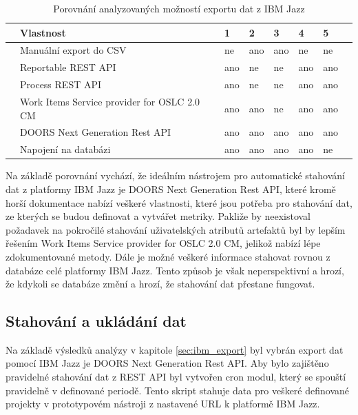 \documentclass[czech,master,public,dept460,male,cpdeclaration,oneside]{diploma}
\begin{document}
\begin{table}[htp]
\centering
\begin{tabular}{@{}llllllll@{}}
\toprule
 & \textbf{Vlastnost}                          & \textbf{1} & \textbf{2} & \textbf{3} & \textbf{4} & \textbf{5} &  \\ \midrule
 & Manuální export do CSV                      & ne         & ano        & ano        & ne         & ne         &  \\
 & Reportable REST API                         & ano        & ne         & ne         & ano        & ano        &  \\
 & Process REST API                            & ano        & ne         & ne         & ano        & ano        &  \\
 & Work Items Service provider for OSLC 2.0 CM & ano        & ano        & ne         & ano        & ano        &  \\
 & DOORS Next Generation Rest API              & ano        & ano        & ano        & ano        & ano        &  \\
 & Napojení na databázi                        & ano        & ano        & ano        & ano        & ne         &  \\ \bottomrule
\end{tabular}
\caption{Porovnání analyzovaných možností exportu dat z IBM Jazz}
\label{tab:ibm_jazz_export}
\end{table}

Na základě porovnání vychází, že ideálním nástrojem pro automatické stahování dat z platformy IBM Jazz je  DOORS Next Generation Rest API, které kromě horší dokumentace nabízí veškeré vlastnosti, které jsou potřeba pro stahování dat, ze kterých se budou definovat a vytvářet metriky. Pakliže by neexistoval požadavek na pokročilé stahování uživatelských atributů artefaktů byl by lepším řešením Work Items Service provider for OSLC 2.0 CM, jelikož nabízí lépe zdokumentované metody. Dále je možné veškeré informace stahovat rovnou z databáze celé platformy IBM Jazz. Tento způsob je však neperspektivní a hrozí, že kdykoli se databáze změní a hrozí, že stahování dat přestane fungovat.

\subsection{Stahování a ukládání dat}
Na základě výsledků analýzy v kapitole \ref{sec:ibm_export} byl vybrán export dat pomocí IBM Jazz je  DOORS Next Generation Rest API. Aby bylo zajištěno pravidelné stahování dat z REST API byl vytvořen cron modul, který se spouští pravidelně v definované periodě. Tento skript stahuje data pro veškeré definované projekty v prototypovém nástroji z nastavené URL k platformě IBM Jazz.
\end{document}
